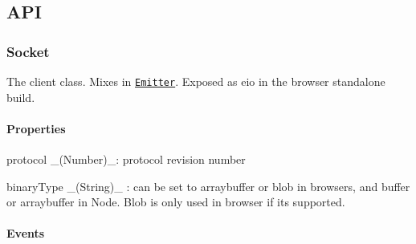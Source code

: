 \subsection*{A\+PI}

\subsubsection*{Socket}

The client class. Mixes in \href{http://github.com/component/emitter}{\tt Emitter}. Exposed as {\ttfamily eio} in the browser standalone build.

\paragraph*{Properties}


\begin{DoxyItemize}
\item {\ttfamily protocol} \+\_\+(\+Number)\+\_\+\+: protocol revision number
\item {\ttfamily binary\+Type} \+\_\+(\+String)\+\_\+ \+: can be set to \textquotesingle{}arraybuffer\textquotesingle{} or \textquotesingle{}blob\textquotesingle{} in browsers, and {\ttfamily buffer} or {\ttfamily arraybuffer} in Node. Blob is only used in browser if it\textquotesingle{}s supported.
\end{DoxyItemize}

\paragraph*{Events}



